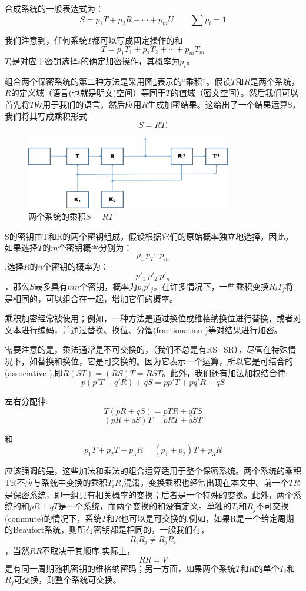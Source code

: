 \documentclass[]{article}
\begin{document}
合成系统的一般表达式为：
\[S=p_1T+p_2R+\cdots+p_mU \qquad \sum p_i=1\]

我们注意到，任何系统$T$都可以写成固定操作的和
\[T=p_1T_1+p_2T_2+\cdots+p_mT_m\]
$T_i$是对应于密钥选择$i$的确定加密操作，其概率为$p_i$。

组合两个保密系统的第二种方法是采用图\ref{Fig:fig3}表示的“乘积”。假设$T$和$R$是两个系统，$R$的定义域（语言(也就是明文)空间）等同于$T$的值域（密文空间）。然后我们可以首先将$T$应用于我们的语言，然后应用$R$生成加密结果。这给出了一个结果运算S，我们将其写成乘积形式
\[S=RT.\]

\begin{figure}[htbp]
	\centering
	\includegraphics[width=0.8\textwidth]{fig3.png}
	\caption{两个系统的乘积$S=RT$}
	\label{Fig:fig3}
\end{figure}

S的密钥由T和R的两个密钥组成，假设根据它们的原始概率独立地选择。因此，如果选择$T$的$m$个密钥概率分别为：
\[p_1\ p_2\cdots p_m\]
,选择$R$的$n$个密钥的概率为：
\[p'_1\ p'_2\ p'_n\]
 ，那么$S$最多具有$mn$个密钥，概率为$p_ip'_j$。在许多情况下，一些乘积变换$R_iT_j$将是相同的，可以组合在一起，增加它们的概率。

乘积加密经常被使用；例如，一种方法是通过换位或维格纳换位进行替换，或者对文本进行编码，并通过替换、换位、分馏(fractionation )等对结果进行加密。

需要注意的是，乘法通常是不可交换的，（我们不总是有RS=SR），尽管在特殊情况下，如替换和换位，它是可交换的。因为它表示一个运算，所以它是可结合的(associative ),即$R(ST)=(RS)T=RST$。此外，我们还有加法加权结合律:
\[p(p'T+q'R)+qS=pp'T+pq'R+qS\]

左右分配律:
\[T(pR+qS)=pTR+qTS\]
\[(pR+qS)T = pRT + qST\]

和
\[p_1T+p_2T+p_3R=(p_1+p_2)T+p_3R\]

应该强调的是，这些加法和乘法的组合运算适用于整个保密系统。两个系统的乘积TR不应与系统中变换的乘积$T_iR_j$混淆，变换乘积也经常出现在本文中。前一个$TR$是保密系统，即一组具有相关概率的变换；后者是一个特殊的变换。此外，两个系统的和$pR+qT$是一个系统，而两个变换的和没有定义。单独的$T_i$和$R_j$不可交换(commute)的情况下，系统$T$和$R$也可以是可交换的,例如，如果R是一个给定周期的Beaufort系统，则所有密钥都是相同的，一般我们有，
\[R_iR_j\neq R_jR_i\]
，当然$RR$不取决于其顺序,实际上，
\[RR=V\]
是有同一周期随机密钥的维格纳密码；另一方面，如果两个系统$T$和$R$的单个$T_i$和$R_j$可交换，则整个系统可交换。
\end{document}
